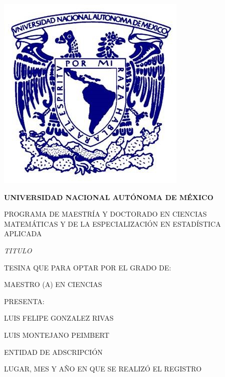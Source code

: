 \documentclass{article}
\begin{document}
\thispagestyle{empty}
\centering
\includegraphics[scale=0.5]{logo-unam.jpg}

\begin{center}
    \LARGE \textbf{UNIVERSIDAD NACIONAL AUTÓNOMA DE MÉXICO}
    \vspace{0.2cm}
   
    \Large PROGRAMA DE MAESTRÍA Y DOCTORADO EN CIENCIAS MATEMÁTICAS Y DE LA ESPECIALIZACIÓN EN ESTADÍSTICA APLICADA
    \vspace{3.0cm}

    \Large \textit{TITULO}
    \vspace{1.2cm}

    \Large TESINA QUE PARA OPTAR POR EL GRADO DE:
    
    MAESTRO (A) EN CIENCIAS
    \vspace{1.2cm}

    \Large PRESENTA:
    
    LUIS FELIPE GONZALEZ RIVAS
    \vspace{1.5cm}

    \Large LUIS MONTEJANO PEIMBERT
    
    ENTIDAD DE ADSCRIPCIÓN %
    \vspace{1.5cm}

    \Large LUGAR, MES Y AÑO EN QUE SE REALIZÓ EL REGISTRO
\end{center}
\newpage
\end{document}

